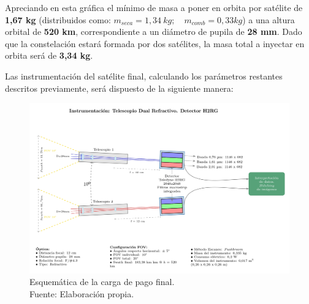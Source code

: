 Apreciando en esta gráfica el mínimo de masa a poner en orbita por satélite de \textbf{1,67 kg} (distribuidos como: $m_{seca}= 1,34\ kg; \quad m_{comb}= 0,33 kg$) a una altura orbital de \textbf{520 km}, correspondiente a un diámetro de pupila de \textbf{28 mm}. Dado que la constelación estará formada por dos satélites, la masa total a inyectar en orbita será de \textbf{3,34 kg}.

Las instrumentación del satélite final, calculando los parámetros restantes descritos previamente, será dispuesto de la siguiente manera:
\begin{landscape}
\begin{figure}[H]
    \centering
    \includegraphics[width=1\linewidth]{5.Mission/TFG_Tikz-8.jpg}
    \caption{Esquemática de la carga de pago final. \\ Fuente: Elaboración propia.}
    \label{fig:enter-label}
\end{figure}
\end{landscape}

